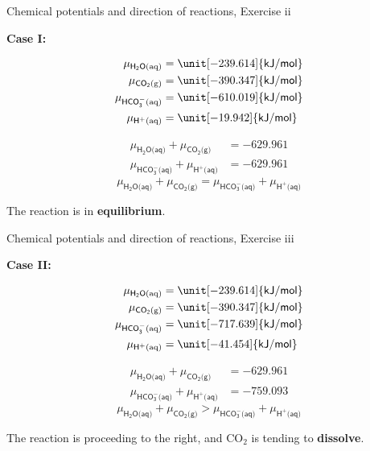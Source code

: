 \begin{frame}{Chemical potentials and direction of reactions, Exercise \; ii}

\textbf{Case I: }

\lcol
\begin{align*}
\mu_{\mathsf{H_{2}O\text{(aq)}}} & =\unit[-239.614]{\mathsf{kJ/mol}}\\
\mu_{\mathsf{CO_{2}\text{(g)}}} & =\unit[-390.347]{\mathsf{kJ/mol}}\\
\mu_{\mathsf{HCO_{3}^{-}\text{(aq)}}} & =\unit[-610.019]{\mathsf{kJ/mol}}\\
\mu_{\mathsf{H^{+}\text{(aq)}}} & =\unit[-19.942]{\mathsf{kJ/mol}}
\end{align*}
\rcol

\begin{align*}
\mu_{\mathsf{H_{2}O\text{(aq)}}}+\mu_{\mathsf{CO_{2}\text{(g)}}} & =-629.961\\
\mu_{\mathsf{HCO_{3}^{-}\text{(aq)}}}+\mu_{\mathsf{H^{+}\text{(aq)}}} & =-629.961
\end{align*}
\[
\boxed{\mu_{\mathsf{H_{2}O\text{(aq)}}}+\mu_{\mathsf{CO_{2}\text{(g)}}}=\mu_{\mathsf{HCO_{3}^{-}\text{(aq)}}}+\mu_{\mathsf{H^{+}\text{(aq)}}}}
\]

The reaction is in \textbf{equilibrium}.

\ecol
\end{frame}
%
%
\begin{frame}{Chemical potentials and direction of reactions, Exercise \; iii}

\textbf{Case II: }

\lcol
\begin{align*}
\mu_{\mathsf{H_{2}O\text{(aq)}}} & =\unit[-239.614]{\mathsf{kJ/mol}}\\
\mu_{\mathsf{CO_{2}\text{(g)}}} & =\unit[-390.347]{\mathsf{kJ/mol}}\\
\mu_{\mathsf{HCO_{3}^{-}\text{(aq)}}} & =\unit[-717.639]{\mathsf{kJ/mol}}\\
\mu_{\mathsf{H^{+}\text{(aq)}}} & =\unit[-41.454]{\mathsf{kJ/mol}}
\end{align*}
\rcol

\begin{align*}
\mu_{\mathsf{H_{2}O\text{(aq)}}}+\mu_{\mathsf{CO_{2}\text{(g)}}} & =-629.961\\
\mu_{\mathsf{HCO_{3}^{-}\text{(aq)}}}+\mu_{\mathsf{H^{+}\text{(aq)}}} & =-759.093
\end{align*}
\[
\boxed{\mu_{\mathsf{H_{2}O\text{(aq)}}}+\mu_{\mathsf{CO_{2}\text{(g)}}}>\mu_{\mathsf{HCO_{3}^{-}\text{(aq)}}}+\mu_{\mathsf{H^{+}\text{(aq)}}}}
\]

The reaction is proceeding to the right, and CO$_{2}$ is tending
to \textbf{dissolve}.

\ecol
\end{frame}
